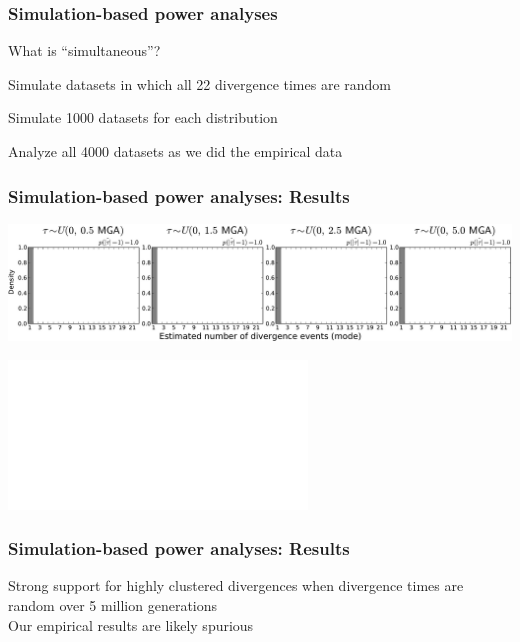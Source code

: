 \begin{frame}
    \frametitle{Simulation-based power analyses}
    What is ``simultaneous''?
    \begin{myitemize}
        \item<2-> Simulate datasets in which all 22 divergence times are random
        \item<4-> Simulate 1000 datasets for each \divTime{} distribution
        \item<4-> Analyze all 4000 datasets as we did the empirical data
    \end{myitemize}
\end{frame}

\begin{frame}[t]
    \frametitle{Simulation-based power analyses: Results}
    \vspace{1cm}
        \centerline{
        \includegraphics[width=\textwidth]{../images/old-sims_power_psi_mode.pdf}}
        \vspace{0mm}
        \centerline{
        \includegraphics<2>[width=\textwidth]{../images/old-sims_power_psi_prob_headless.pdf}}
\end{frame}

\begin{frame}
    \frametitle{Simulation-based power analyses: Results}
    Strong support for highly clustered divergences when divergence times
    are random over 5 million generations \\
    \bigskip
    Our empirical results are likely spurious
\end{frame}

